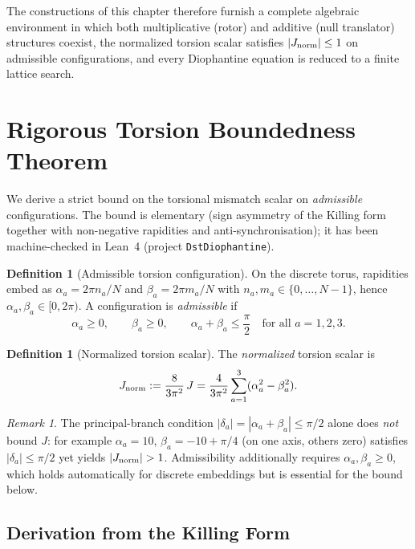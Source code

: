 \documentclass[dvipdfmx,a4paper]{article}
\theoremstyle{definition}
\newtheorem{definition}[theorem]{Definition}
\theoremstyle{remark}
\newtheorem{remark}[theorem]{Remark}
\newcommand{\Jnorm}{J_{\rm norm}}
\begin{document}
The constructions of this chapter therefore furnish a complete algebraic environment in which both multiplicative (rotor) and additive (null translator) structures coexist, the normalized torsion scalar satisfies \(|\Jnorm|\leq 1\) on admissible configurations, and every Diophantine equation is reduced to a finite lattice search.

\section{Rigorous Torsion Boundedness Theorem}

We derive a strict bound on the torsional mismatch scalar on \emph{admissible} configurations. The bound is elementary (sign asymmetry of the Killing form together with non-negative rapidities and anti-synchronisation); it has been machine-checked in Lean~4 (project \texttt{DstDiophantine}).

\begin{definition}[Admissible torsion configuration]
\label{def:admissible}
On the discrete torus, rapidities embed as \(\alpha_a = 2\pi n_a/N\) and \(\beta_a = 2\pi m_a/N\) with \(n_a,m_a \in \{0,\dots,N-1\}\), hence \(\alpha_a,\beta_a \in [0,2\pi)\). A configuration is \emph{admissible} if
\[
\alpha_a \geq 0, \qquad \beta_a \geq 0, \qquad \alpha_a + \beta_a \leq \frac{\pi}{2}
\quad \text{for all } a = 1,2,3.
\]
\end{definition}

\begin{definition}[Normalized torsion scalar]
\label{def:Jnorm}
The \emph{normalized} torsion scalar is
\[
\Jnorm := \frac{8}{3\pi^2}\,J
= \frac{4}{3\pi^2}\sum_{a=1}^3 (\alpha_a^2 - \beta_a^2).
\]
\end{definition}

\begin{remark}
The principal-branch condition \(|\delta_a| = |\alpha_a + \beta_a| \leq \pi/2\) alone does \emph{not} bound \(J\): for example \(\alpha_a = 10\), \(\beta_a = -10 + \pi/4\) (on one axis, others zero) satisfies \(|\delta_a| \leq \pi/2\) yet yields \(|\Jnorm| > 1\). Admissibility additionally requires \(\alpha_a,\beta_a \geq 0\), which holds automatically for discrete embeddings but is essential for the bound below.
\end{remark}

\subsection{Derivation from the Killing Form}
\end{document}
